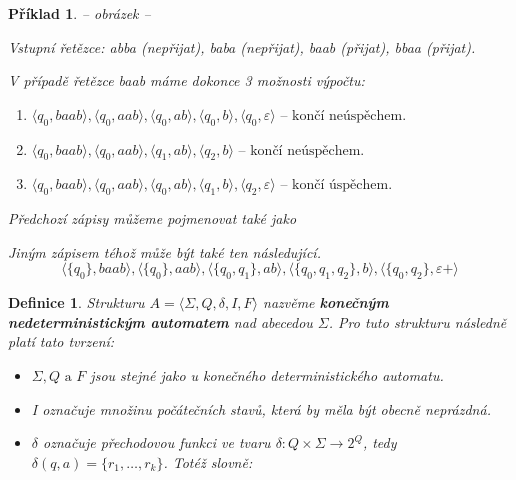 \documentclass[10pt, a4paper, titlepage]{article}
\theoremstyle{note}
\newtheorem{definice}{\textbf{Definice}}
\newtheorem{priklad}{\textbf{Příklad}}
\begin{document}
\begin{priklad}
-- obrázek -- %

Vstupní řetězce: \textit{abba} (nepřijat), \textit{baba} (nepřijat), \textit{baab} (přijat), \textit{bbaa} (přijat).

V případě řetězce \textit{baab} máme dokonce 3 možnosti výpočtu:
\begin{enumerate}
\item
$\langle q_{0}, baab \rangle, \langle q_{0}, aab \rangle, \langle q_{0}, ab \rangle, \langle q_{0}, b \rangle, \langle q_{0}, \varepsilon \rangle \text{ -- končí neúspěchem.}$
\item
$\langle q_{0}, baab \rangle, \langle q_{0}, aab \rangle, \langle q_{1}, ab \rangle, \langle q_{2}, b \rangle \text{ -- končí neúspěchem.}$
\item
$\langle q_{0}, baab \rangle, \langle q_{0}, aab \rangle, \langle q_{0}, ab \rangle, \langle q_{1}, b \rangle, \langle q_{2}, \varepsilon \rangle \text{ -- končí úspěchem.}$ 
\end{enumerate}
Předchozí zápisy můžeme pojmenovat také jako 

Jiným zápisem téhož může být také ten následující.
$$
\langle \lbrace q_{0} \rbrace, baab \rangle, \langle \lbrace q_{0} \rbrace, aab \rangle, \langle \lbrace q_{0}, q_{1} \rbrace, ab \rangle,
\langle \lbrace q_{0}, q_{1}, q_{2} \rbrace, b \rangle, \langle \lbrace q_{0}, q_{2} \rbrace, \varepsilon+ \rangle
$$ 
\end{priklad}

\begin{definice}
Strukturu $A = \langle \Sigma, Q, \delta, I, F \rangle$ nazvěme \textbf{konečným nedeterministickým automatem} nad abecedou $\Sigma$. Pro tuto strukturu následně platí tato tvrzení:
\begin{itemize}
\item
$\Sigma, Q \text{ a } F$ jsou stejné jako u konečného deterministického automatu.
\item
\textit{I} označuje množinu počátečních stavů, která by měla být obecně neprázdná.
\item
$\delta$ označuje přechodovou funkci ve tvaru $\delta : Q \times \Sigma \rightarrow 2^{Q}$, tedy $\delta (q, a) = \lbrace r_{1}, \ldots, r_{k} \rbrace$. Totéž slovně: 
\end{itemize}
\end{definice}
\end{document}
